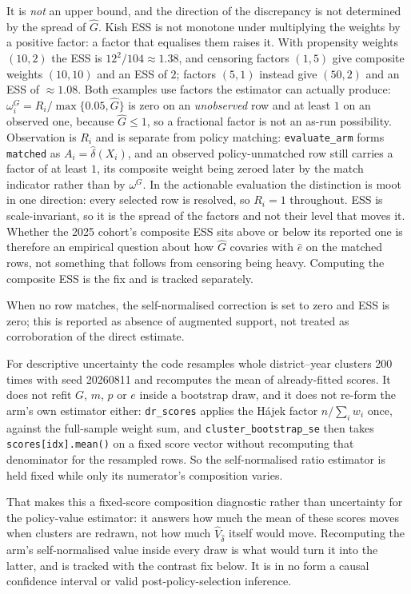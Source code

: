 \documentclass[11pt,a4paper]{article}
\theoremstyle{plain}
\theoremstyle{definition}
\theoremstyle{remark}
\begin{document}
It is \emph{not} an upper bound, and the direction of the discrepancy is not determined by the
spread of $\hat G$. Kish ESS is not monotone under multiplying the weights by a positive
factor: a factor that equalises them raises it. With propensity weights $(10,2)$ the ESS is
$12^2/104\approx1.38$, and censoring factors $(1,5)$ give composite weights $(10,10)$ and an
ESS of $2$; factors $(5,1)$ instead give $(50,2)$ and an ESS of $\approx1.08$. Both examples use
factors the estimator can actually produce: $\omega^G_i=R_i/\max\{0.05,\hat G\}$ is zero on an
\emph{unobserved} row and at least $1$ on an observed one, because $\hat G\le1$, so a fractional
factor is not an as-run possibility. Observation is $R_i$ and is separate from policy matching:
\texttt{evaluate\_arm} forms \texttt{matched} as $A_i=\hat\delta(X_i)$, and an observed
policy-unmatched row still carries a factor of at least $1$, its composite weight being zeroed
later by the match indicator rather than by $\omega^G$. In the actionable evaluation the
distinction is moot in one direction: every selected row is resolved, so $R_i=1$ throughout. ESS
is scale-invariant, so it is the spread of the factors and not their level that moves it. Whether the
2025 cohort's composite ESS sits above or below its reported one is therefore an empirical
question about how $\hat G$ covaries with $\hat e$ on the matched rows, not something that
follows from censoring being heavy. Computing the composite ESS is the fix and is tracked
separately.

When no row matches, the self-normalised correction is set to zero and ESS is zero; this is
reported as absence of augmented support, not treated as corroboration of the direct estimate.

For descriptive uncertainty the code resamples whole district--year clusters 200 times with
seed 20260811 and recomputes the mean of already-fitted scores. It does not refit $G$, $m$, $p$
or $e$ inside a bootstrap draw, and it does not re-form the arm's own estimator either:
\texttt{dr\_scores} applies the H\'ajek factor $n/\sum_iw_i$ once, against the full-sample weight
sum, and \texttt{cluster\_bootstrap\_se} then takes \texttt{scores[idx].mean()} on a fixed score
vector without recomputing that denominator for the resampled rows. So the self-normalised ratio
estimator is held fixed while only its numerator's composition varies.

That makes this a fixed-score composition diagnostic rather than uncertainty for the policy-value
estimator: it answers how much the mean of these scores moves when clusters are redrawn, not how
much $\hat V_{\hat\delta}$ itself would move. Recomputing the arm's self-normalised value inside
every draw is what would turn it into the latter, and is tracked with the contrast fix below. It
is in no form a causal confidence interval or valid post-policy-selection inference.
\end{document}
